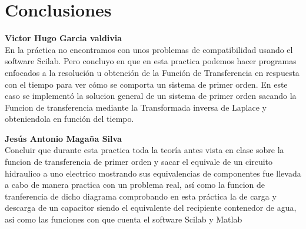 \documentclass[letterpaper,10pt]{article}
\begin{document}
\section{Conclusiones}
\vspace*{0.3in}
\textbf{Victor Hugo Garcia valdivia\\}
En la práctica no encontramos con unos problemas de compatibilidad usando el software Scilab.
Pero concluyo en que en esta practica podemos hacer programas enfocados a la resolución u 
obtención de la Función de Transferencia en respuesta con el tiempo para ver cómo se comporta
un sistema de primer orden. En este caso se implementó la solucion general de un sistema de 
primer orden sacando la Funcion de transferencia mediante la Transformada inversa de Laplace y
obteniendola en función del tiempo.\\
	 
\vspace*{0.3in}
	  
\textbf{Jesús Antonio Magaña Silva} \\
Concluir que durante esta practica toda la teoría antes vista en clase sobre la funcion de transferencia de primer orden y sacar el equivale de un circuito hidraulico a uno electrico mostrando sus equivalencias de componentes fue llevada a cabo de manera practica con un problema real, así como la funcion de tranferencia de dicho diagrama comprobando en esta práctica la de carga y descarga de un capacitor siendo el equivalente del recipiente contenedor de agua, asi como las funciones con que cuenta el software Scilab y Matlab\\
\end{document}
